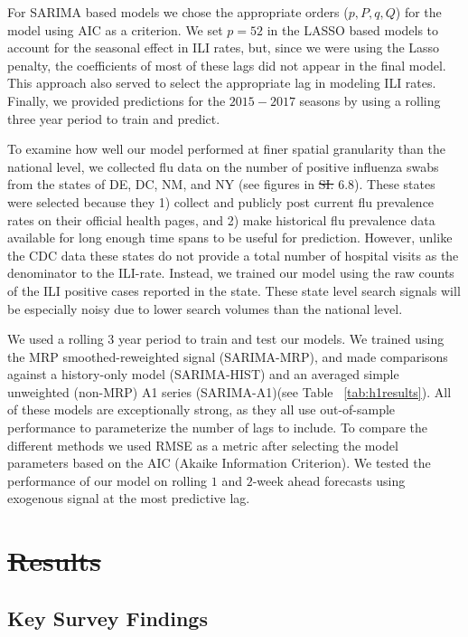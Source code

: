 \documentclass[fleqn,10pt]{wlscirep}
\providecommand{\DIFadd}[1]{{\protect\color{blue}\uwave{#1}}} %
\providecommand{\DIFdel}[1]{{\protect\color{red}\sout{#1}}}                      %
\providecommand{\DIFaddbegin}{} %
\providecommand{\DIFaddend}{} %
\providecommand{\DIFdelbegin}{} %
\providecommand{\DIFdelend}{} %
\begin{document}
For SARIMA based models we chose the appropriate orders ($p,P,q,Q$) for the model using AIC as a criterion. We set $p=52$ in the LASSO based models to account for the seasonal effect in ILI rates, but, since we were using the Lasso penalty, the coefficients of most of these lags did not appear in the final model. This approach also served to select the appropriate lag in modeling ILI rates. Finally, we provided predictions for the $2015-2017$ seasons by using a rolling three year period to train and predict.

To examine how well our model performed at finer spatial granularity than the national level, we collected flu data on the number of positive influenza swabs from the states of DE, DC, NM, and NY (see figures in \DIFdelbegin \DIFdel{SI: }\DIFdelend \DIFaddbegin \DIFadd{Supplementary Information }\DIFaddend 6.8). These states were selected because they 1) collect and publicly post current flu prevalence rates on their official health pages, and 2) make historical flu prevalence data available for long enough time spans to be useful for prediction. However, unlike the CDC data these states do not provide a total number of hospital visits as the denominator to the ILI-rate. Instead, we trained our model using the raw counts of the ILI positive cases reported in the state. These state level search signals will be especially noisy due to lower search volumes than the national level. 

We used a rolling $3$ year period to train and test our models. We trained using the MRP smoothed-reweighted signal (SARIMA-MRP), and made comparisons against a history-only model (SARIMA-HIST) and an averaged simple unweighted (non-MRP) A1 series (SARIMA-A1)(see Table ~\ref{tab:h1results}). All of these models are exceptionally strong, as they all use out-of-sample performance to parameterize the number of lags to include. To compare the different methods we used RMSE as a metric after selecting the model parameters based on the AIC (Akaike Information Criterion). We tested the performance of our model on rolling $1$ and $2$-week ahead forecasts using exogenous signal at the most predictive lag.

\DIFdelbegin \section*{\DIFdel{Results}}

\DIFdelend \subsection*{Key Survey Findings}
\end{document}
